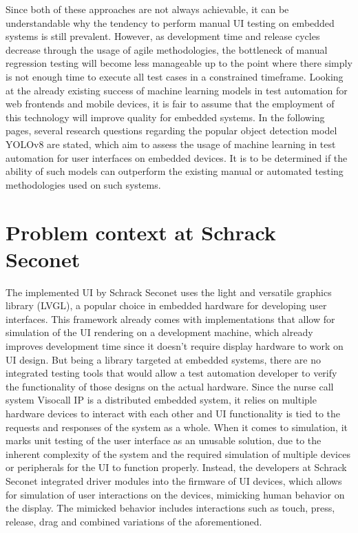 \documentclass[Proposal,BIC,english,IEEE]{BASE/twbook} %
\begin{document}
Since both of these approaches are not always achievable, it can be understandable why the tendency to perform manual UI testing on embedded systems is still prevalent.
However, as development time and release cycles decrease through the usage of agile methodologies, the bottleneck of manual regression testing will become less manageable up to the point where there simply is not enough time to execute all test cases in a constrained timeframe.
Looking at the already existing success of machine learning models in test automation for web frontends and mobile devices, it is fair to assume that the employment of this technology will improve quality for embedded systems. In the following pages, several research questions regarding the popular object detection model YOLOv8 are stated, which aim to assess the usage of machine learning in test automation for user interfaces on embedded devices. It is to be determined if the ability of such models can outperform the existing manual or automated testing methodologies used on such systems.
\section{Problem context at Schrack Seconet}
The implemented UI by Schrack Seconet uses the light and versatile graphics library\autocite{LVGLLightVersatile} (LVGL), a popular choice in embedded hardware for developing user interfaces. This framework already comes with implementations that allow for simulation of the UI rendering on a development machine, which already improves development time since it doesn't require display hardware to work on UI design.
But being a library targeted at embedded systems, there are no integrated testing tools that would allow a test automation developer to verify the functionality of those designs on the actual hardware. Since the nurse call system Visocall IP\autocite{VisocallIPModerne} is a distributed embedded system, it relies on multiple hardware devices to interact with each other and UI functionality is tied to the requests and responses of the system as a whole.
When it comes to simulation, it marks unit testing of the user interface as an unusable solution, due to the inherent complexity of the system and the required simulation of multiple devices or peripherals for the UI to function properly.
Instead, the developers at Schrack Seconet integrated driver modules into the firmware of UI devices, which allows for simulation of user interactions on the devices, mimicking human behavior on the display. The mimicked behavior includes interactions such as touch, press, release, drag and combined variations of the aforementioned.
\end{document}
